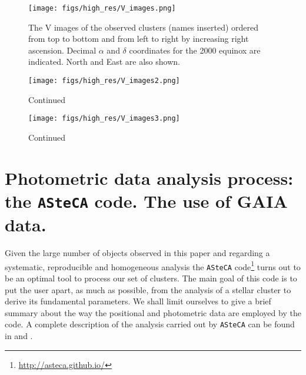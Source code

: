 \documentclass{aa}
\begin{document}
\begin{figure*}[ht]
    \centering
     \texttt{[image: figs/high\_res/V\_images.png]}   
     \caption{The V images of the observed clusters (names inserted) ordered
     from top to bottom and from left to right by increasing right ascension.
     Decimal $\alpha$ and $\delta$ coordinates for the 2000 equinox are
     indicated. North and East are also shown.}
    \label{fig2}
\end{figure*}

\begin{figure*}[ht]
    \addtocounter{figure}{-1}
    \centering
    \texttt{[image: figs/high\_res/V\_images2.png]}
    \caption{Continued}
    \label{fig2a}
\end{figure*}

\begin{figure*}[ht]
    \addtocounter{figure}{-1}
    \centering
    \texttt{[image: figs/high\_res/V\_images3.png]}
    \caption{Continued}
    \label{fig2b}
\end{figure*}








\section{Photometric data analysis process: the \texttt{ASteCA} code. The use of
GAIA data.}
\label{sec:photom_analysis}

Given the large number of objects observed in this paper and regarding a
systematic, reproducible and homogeneous analysis the \texttt{ASteCA}
code\footnote{\url{http://asteca.github.io/}} turns out to be an optimal tool
to process our set of clusters. The main goal of this code is to put the user
apart, as much as possible, from the analysis of a stellar cluster to derive
its fundamental parameters. We shall limit ourselves to give a brief summary
about the way the positional and photometric data are employed by the code.
A complete description of the analysis carried out by
\texttt{ASteCA} can be found in \cite{Perren_2015} and \cite{Perren_2017}.
\end{document}
